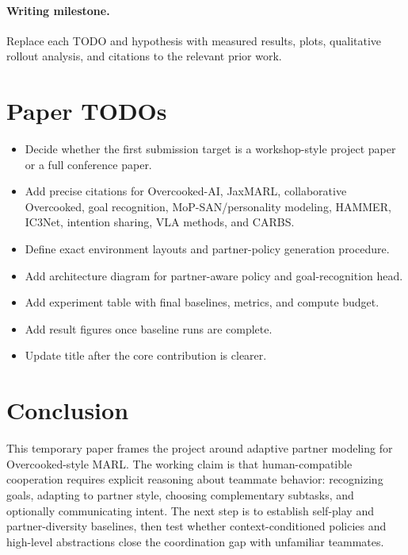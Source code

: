 \documentclass[letterpaper]{article} %
\begin{document}
\paragraph{Writing milestone.}
Replace each TODO and hypothesis with measured results, plots, qualitative rollout analysis, and citations to the relevant prior work.

\section{Paper TODOs}

\begin{itemize}
    \item Decide whether the first submission target is a workshop-style project paper or a full conference paper.
    \item Add precise citations for Overcooked-AI, JaxMARL, collaborative Overcooked, goal recognition, MoP-SAN/personality modeling, HAMMER, IC3Net, intention sharing, VLA methods, and CARBS.
    \item Define exact environment layouts and partner-policy generation procedure.
    \item Add architecture diagram for partner-aware policy and goal-recognition head.
    \item Add experiment table with final baselines, metrics, and compute budget.
    \item Add result figures once baseline runs are complete.
    \item Update title after the core contribution is clearer.
\end{itemize}

\section{Conclusion}

This temporary paper frames the project around adaptive partner modeling for Overcooked-style MARL. The working claim is that human-compatible cooperation requires explicit reasoning about teammate behavior: recognizing goals, adapting to partner style, choosing complementary subtasks, and optionally communicating intent. The next step is to establish self-play and partner-diversity baselines, then test whether context-conditioned policies and high-level abstractions close the coordination gap with unfamiliar teammates.
\end{document}
